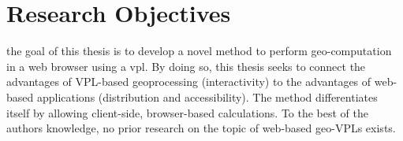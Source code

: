 




\section{Research Objectives}
the goal of this thesis is to develop a novel method to perform geo-computation in a web browser using a \ac{vpl}. 
By doing so, this thesis seeks to connect the advantages of VPL-based geoprocessing (interactivity) to the advantages of web-based applications (distribution and accessibility). 
The method differentiates itself by allowing client-side, browser-based calculations. 
To the best of the authors knowledge, no prior research on the topic of web-based geo-VPLs exists.





